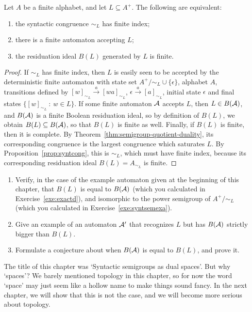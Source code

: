 \begin{theorem}\label{thm:regularlangs}
  Let $A$ be a finite alphabet, and let $L \subseteq A^+$. The following are equivalent:
\begin{enumerate}
  \item the syntactic congruence $\sim_L$ has finite index;
  \item there is a finite automaton accepting $L$;  
  \item the residuation ideal $B(L)$ generated by $L$ is finite.
  \end{enumerate}
\end{theorem}
\begin{proof}
If $\sim_L$ has finite index, then $L$ is easily seen to be accepted by the deterministic finite automaton with state set $A^+/{\sim_L} \cup \{\epsilon\}$, alphabet $A$, transitions defined by $[w]_{\sim_L} \stackrel{a}{\to} [wa]_{\sim_L}$, $\epsilon \stackrel{a}{\to} [a]_{\sim_L}$, initial state $\epsilon$ and final states $\{[w]_{\sim_L} \ \colon \ w \in L\}$. If some finite automaton $\mathcal{A}$ accepts $L$, then $L \in B(\mathcal{A})$, and $B(\mathcal{A})$ is a finite Boolean residuation ideal, so by definition of $B(L)$, we obtain $B(L) \subseteq B(\mathcal{A})$, so that $B(L)$ is finite as well. Finally, if $B(L)$ is finite, then it is complete. By Theorem~\ref{thm:semigroup-quotient-duality}, its corresponding congruence is the largest congruence which saturates $L$. By Proposition~\ref{prop:syntcong}, this is $\sim_L$, which must have finite index, because its corresponding residuation ideal $B(L) = A_{\sim_L}$ is finite.
\end{proof}
\begin{exercise}
  \begin{enumerate}
  \item \medium Verify, in the case of the example automaton given at the beginning of this chapter, that $B(L)$ is equal to $B(\mathcal{A})$ (which you calculated in Exercise~\ref{exe:exactd}), and isomorphic to the power semigroup of $A^+/{\sim_L}$ (which you calculated in Exercise~\ref{exe:syntsemexa}).
\item \easy Give an example of an automaton $\mathcal{A}'$ that recognizes $L$ but has $B(\mathcal{A})$ strictly bigger than $B(L)$.
\item \hard Formulate a conjecture about when $B(\mathcal{A})$ is equal to $B(L)$, and prove it.
  \end{enumerate}
  
\end{exercise}

The title of this chapter was `Syntactic semigroups as dual spaces'. But why `spaces'? We barely mentioned topology in this chapter, so for now the word `space' may just seem like a hollow name to make things sound fancy. In the next chapter, we will show that this is not the case, and we will become more serious about topology.

